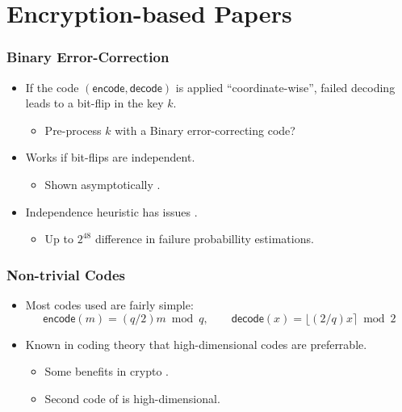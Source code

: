 \documentclass{beamer}
\newcommand{\encode}{\mathsf{encode}}
\newcommand{\decode}{\mathsf{decode}}
\theoremstyle{definition}
\begin{document}
\section{Encryption-based Papers}
\begin{frame}
	\frametitle{Binary Error-Correction}
	\begin{itemize}
		\item If the code $(\encode, \decode)$ is applied ``coordinate-wise'', failed decoding leads to a \alert{bit-flip} in the key $k$.\pause
		\begin{itemize}
			\item \alert{Pre-process} $k$ with a Binary error-correcting code?\pause
		\end{itemize}
	\item Works if bit-flips are \alert{independent}.\pause
	\begin{itemize}
		\item Shown \alert{asymptotically} \cite{EPRINT:JinZha17}.\pause
	\end{itemize}
\item Independence heuristic \alert{has issues} \cite{PQCRYPTO:DAnVerVer19}.\pause
\begin{itemize}
	\item Up to $2^{48}$ difference in failure probabillity estimations.
\end{itemize}
	\end{itemize}
	
\end{frame}
\begin{frame}
	\frametitle{Non-trivial Codes}
	\begin{itemize}
		\item Most codes used are fairly \alert{simple}:\pause
		\begin{equation*}
		\encode(m) = (q/2)m \bmod q,\qquad \decode(x) = \lfloor (2/q)x\rceil\bmod 2
		\end{equation*}\pause
		\item Known in coding theory that \alert{high-dimensional} codes are preferrable.\pause
		\begin{itemize}
			\item Some benefits in crypto \cite{Leech, E8}.
			\item Second code of \cite{TCC:BDGM19} is \alert{high-dimensional}.
		\end{itemize}
	\end{itemize}
\end{frame}
\end{document}

